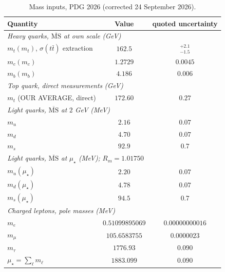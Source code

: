 \documentclass[aps,twocolumn,superscriptaddress,nofootinbib,floatfix]{revtex4-2}
\newcommand{\MSbar}{\overline{\mathrm{MS}}}
\newcommand{\mstar}{\mu_\star}
\begin{document}
\begin{table}[h]
\centering
\caption{Mass inputs, PDG 2026 (corrected 24 September 2026).}
\label{tab:inputs}
\footnotesize
\setlength{\tabcolsep}{5pt}
\begin{tabular}{lcc}
\hline
Quantity & Value & quoted uncertainty \\
\hline
\multicolumn{3}{l}{\emph{Heavy quarks, $\MSbar$ at own scale (GeV)}}\\
$m_t(m_t)$, $\sigma(t\bar t)$ extraction & $162.5$ & $^{+2.1}_{-1.5}$\\
$m_c(m_c)$ & $1.2729$ & $0.0045$\\
$m_b(m_b)$ & $4.186$ & $0.006$\\
\multicolumn{3}{l}{\emph{Top quark, direct measurements (GeV)}}\\
$m_t$ (OUR AVERAGE, direct) & $172.60$ & $0.27$\\
\multicolumn{3}{l}{\emph{Light quarks, $\MSbar$ at $2$ GeV (MeV)}}\\
$m_u$ & $2.16$ & $0.07$\\
$m_d$ & $4.70$ & $0.07$\\
$m_s$ & $92.9$ & $0.7$\\
\multicolumn{3}{l}{\emph{Light quarks, $\MSbar$ at $\mstar$ (MeV); $R_m=1.01750$}}\\
$m_u(\mstar)$ & $2.20$ & $0.07$\\
$m_d(\mstar)$ & $4.78$ & $0.07$\\
$m_s(\mstar)$ & $94.5$ & $0.7$\\
\multicolumn{3}{l}{\emph{Charged leptons, pole masses (MeV)}}\\
$m_e$ & $0.51099895069$ & $0.00000000016$\\
$m_\mu$ & $105.6583755$ & $0.0000023$\\
$m_\tau$ & $1776.93$ & $0.090$\\
$\mstar=\sum_\ell m_\ell$ & $1883.099$ & $0.090$\\
\hline
\end{tabular}
\end{table}
\end{document}
